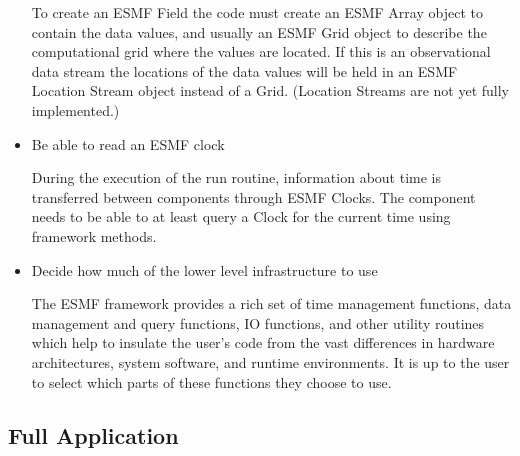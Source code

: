 \begin{itemize}
To create an ESMF Field the code must create an ESMF Array object to
contain the data values, and usually an ESMF Grid object to describe the
computational grid where the values are located.  If this is an
observational data stream the locations of the data values will be held in
an ESMF Location Stream object instead of a Grid.  (Location Streams
are not yet fully implemented.)

\item Be able to read an ESMF clock

During the execution of the run routine, information about time 
is transferred between components through ESMF Clocks.  The 
component needs to be able to at least query a Clock for the 
current time using framework methods.

\item Decide how much of the lower level infrastructure to use

The ESMF framework provides a rich set of time management functions,
data management and query functions, IO functions, and other utility
routines which help to insulate the user's code from the vast differences
in hardware architectures, system software, and runtime environments.
It is up to the user to select which parts of these functions they
choose to use.

\end{itemize}

\subsection{Full Application}

